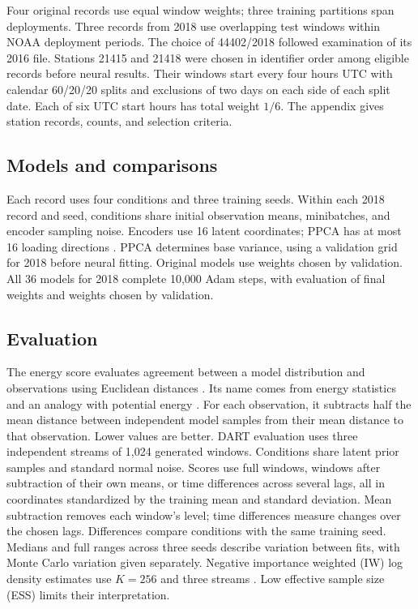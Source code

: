 \documentclass{article}
\begin{document}
Four original records use equal window weights; three training partitions span deployments. Three records from 2018 use overlapping test windows within NOAA deployment periods. The choice of 44402/2018 followed examination of its 2016 file. Stations 21415 and 21418 were chosen in identifier order among eligible records before neural results. Their windows start every four hours UTC with calendar 60/20/20 splits and exclusions of two days on each side of each split date. Each of six UTC start hours has total weight $1/6$. The appendix gives station records, counts, and selection criteria.

\subsection{Models and comparisons}
Each record uses four conditions and three training seeds. Within each 2018 record and seed, conditions share initial observation means, minibatches, and encoder sampling noise. Encoders use 16 latent coordinates; PPCA has at most 16 loading directions \citep{TippingBishop1999ProbabilisticPCA}. PPCA determines base variance, using a validation grid for 2018 before neural fitting. Original models use weights chosen by validation. All 36 models for 2018 complete 10,000 Adam steps, with evaluation of final weights and weights chosen by validation.

\subsection{Evaluation}
The energy score evaluates agreement between a model distribution and observations using Euclidean distances \citep{GneitingRaftery2007ProperScoringRules}. Its name comes from energy statistics and an analogy with potential energy \citep{RizzoSzekely2016EnergyDistance}. For each observation, it subtracts half the mean distance between independent model samples from their mean distance to that observation. Lower values are better. DART evaluation uses three independent streams of 1,024 generated windows. Conditions share latent prior samples and standard normal noise. Scores use full windows, windows after subtraction of their own means, or time differences across several lags, all in coordinates standardized by the training mean and standard deviation. Mean subtraction removes each window's level; time differences measure changes over the chosen lags. Differences compare conditions with the same training seed. Medians and full ranges across three seeds describe variation between fits, with Monte Carlo variation given separately. Negative importance weighted (IW) log density estimates use $K=256$ and three streams \citep{BurdaGrosseSalakhutdinov2016IWAE}. Low effective sample size (ESS) limits their interpretation.
\end{document}
